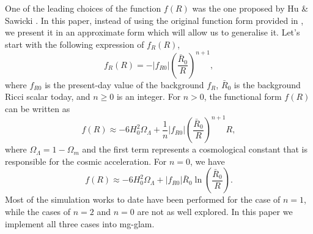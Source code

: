 One of the leading choices of the function $f(R)$ was the one proposed by Hu \& Sawicki \cite{Hu:2007nk}. In this paper, instead of using the original function form provided in \cite{Hu:2007nk}, we present it in an approximate form which will allow us to generalise it. Let's start with the following expression of $f_R(R)$,
\begin{equation}\label{eq:fR_HS}
    f_R(R) = -\left|f_{R0}\right|\left(\frac{\bar{R}_0}{R}\right)^{n+1},
\end{equation}
where $f_{R0}$ is the present-day value of the background $f_R$, $\bar{R}_0$ is the background Ricci scalar today, and $n\geq0$ is an integer. For $n>0$, the functional form $f(R)$ can be written as
\begin{equation}\label{eq:fR_HS_original}
    f(R) \approx -6H_0^2\Omega_\Lambda + \frac{1}{n}\left|f_{R0}\right|\left(\frac{\bar{R}_0}{R}\right)^{n+1}R,
\end{equation}
where $\Omega_\Lambda=1-\Omega_m$ and the first term represents a cosmological constant that is responsible for the cosmic acceleration. For $n=0$, we have
\begin{equation}\label{eq:fR_log}
    f(R) \approx -6H_0^2\Omega_\Lambda + \left|f_{R0}\right|\bar{R}_0\ln\left(\frac{\bar{R}_0}{R}\right).
\end{equation}
Most of the simulation works to date have been performed for the case of $n=1$, while the cases of $n=2$ and $n=0$ are not as well explored. In this paper we implement all three cases into {\sc mg}-{\sc glam}. 

